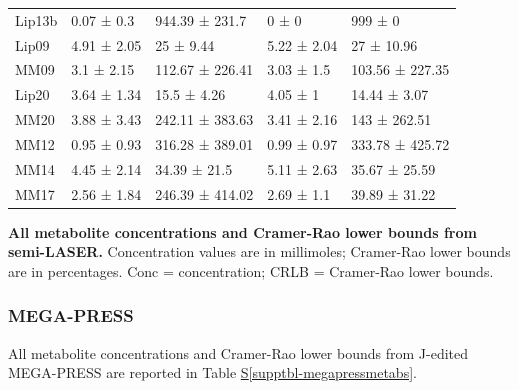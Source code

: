 \documentclass[
true
]{sn-jnl}
\newcommand*\quartosupptblref[1]{Table \hyperref[#1]{S\ref{#1}}}
\begin{document}
\begin{supptbl}
{{\begin{longtable*}[]{@{}lllll@{}}
Lip13b & 0.07 ± 0.3 & 944.39 ± 231.7 & 0 ± 0 & 999 ± 0 \\
Lip09 & 4.91 ± 2.05 & 25 ± 9.44 & 5.22 ± 2.04 & 27 ± 10.96 \\
MM09 & 3.1 ± 2.15 & 112.67 ± 226.41 & 3.03 ± 1.5 & 103.56 ± 227.35 \\
Lip20 & 3.64 ± 1.34 & 15.5 ± 4.26 & 4.05 ± 1 & 14.44 ± 3.07 \\
MM20 & 3.88 ± 3.43 & 242.11 ± 383.63 & 3.41 ± 2.16 & 143 ± 262.51 \\
MM12 & 0.95 ± 0.93 & 316.28 ± 389.01 & 0.99 ± 0.97 & 333.78 ± 425.72 \\
MM14 & 4.45 ± 2.14 & 34.39 ± 21.5 & 5.11 ± 2.63 & 35.67 ± 25.59 \\
MM17 & 2.56 ± 1.84 & 246.39 ± 414.02 & 2.69 ± 1.1 & 39.89 ± 31.22 \\
\end{longtable*}
}

}

\caption{\label{supptbl-metabolites}\textbf{All metabolite
concentrations and Cramer-Rao lower bounds from semi-LASER.}
Concentration values are in millimoles; Cramer-Rao lower bounds are in
percentages. Conc = concentration; CRLB = Cramer-Rao lower bounds.}

\end{supptbl}%

\subsubsection*{MEGA-PRESS}\label{mega-press}

All metabolite concentrations and Cramer-Rao lower bounds from J-edited
MEGA-PRESS are reported in \quartosupptblref{supptbl-megapressmetabs}.
\end{document}
